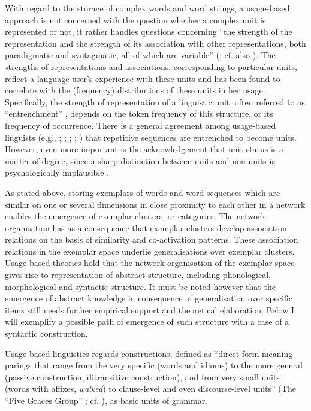 With regard to the storage of complex words and word strings, a usage-based approach is not concerned with the question whether a complex unit is represented or not, it rather handles questions concerning ``the strength of the representation and the strength of its association with other representations, both paradigmatic and syntagmatic, all of which are variable'' (\citealt[24]{bybee-book-2010}; cf. also \citealt{lieven-2010}). The strengths of representations and associations, corresponding to particular units, reflect a language user's experience with these units and has been found to correlate with the (frequency) distributions of these units in her usage. Specifically, the strength of representation of a linguistic unit, often referred to as “entrenchment” \citep{langacker-foundations-1987,croft-2001,tomasello-constructing-2003,blumenthal}, depends on the token frequency of this structure, or its frequency of occurrence. There is a general agreement among usage-based linguists (e.g., \citealt[59]{langacker-foundations-1987}; \citealt[581]{bybee-scheibman}; \citealt[106-107]{tomasello-constructing-2003}; \citealt[283]{bybee-frequency-2007}; \citealt[68]{blumenthal}) that repetitive sequences are entrenched to become units. However, even more important is the acknowledgement that unit status is a matter of degree, since a sharp distinction between units and non-units is psychologically implausible \citep[59]{langacker-foundations-1987}.

As stated above, storing exemplars of words and word sequences which are similar on one or several dimensions in close proximity to each other in a network enables the emergence of exemplar clusters, or categories. The network organisation has as a consequence that exemplar clusters develop association relations on the basis of similarity and co-activation patterns. These association relations in the exemplar space underlie generalisations over exemplar clusters. Usage-based theories hold that the network organisation of the exemplar space gives rise to representation of abstract structure, including phonological, morphological and syntactic structure. It must be noted however that the emergence of abstract knowledge in consequence of generalisation over specific items still needs further empirical support and theoretical elaboration. Below I will exemplify a possible path of emergence of such structure with a case of a syntactic construction.

Usage-based linguistics regards constructions, defined as ``direct form-meaning parings that range from the very specific (words and idioms) to the more general (passive construction, ditransitive construction), and from very small units (words with affixes, \textit{walked}) to clause-level and even discourse-level units'' (The “Five Graces Group” \citeyear[5]{five-graces}; cf. \citealt{croft-2001, goldberg-2003, goldberg-2006}), as basic units of grammar.

